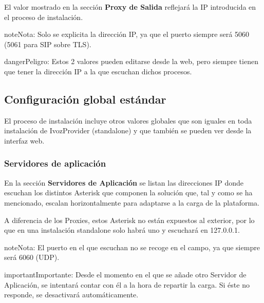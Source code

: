 \documentclass[letterpaper,10pt,spanish]{sphinxmanual}
\begin{document}
El valor mostrado en la sección \textbf{Proxy de Salida} reflejará la IP introducida en el proceso de instalación.

\noindent{}

\begin{notice}{note}{Nota:}
Solo se explicita la dirección IP, ya que el puerto siempre será 5060 (5061 para SIP sobre TLS).
\end{notice}

\begin{notice}{danger}{Peligro:}
Estos 2 valores pueden editarse desde la web, pero siempre tienen que tener la dirección IP a la que escuchan dichos procesos.
\end{notice}


\subsection{Configuración global estándar}
\label{internal_calls/god_portal:configuracion-global-estandar}
El proceso de instalación incluye otros valores globales que son iguales en toda instalación de IvozProvider (standalone) y que también se pueden ver desde la interfaz web.


\subsubsection{Servidores de aplicación}
\label{internal_calls/god_portal:servidores-de-aplicacion}
En la sección \textbf{Servidores de Aplicación} se listan las direcciones IP donde escuchan los distintos Asterisk que componen la solución que, tal y como se ha mencionado, escalan horizontalmente para adaptarse a la carga de la plataforma.

A diferencia de los Proxies, estos Asterisk no están expuestos al exterior, por lo que en una instalación standalone solo habrá uno y escuchará en 127.0.0.1.

\noindent{}

\begin{notice}{note}{Nota:}
El puerto en el que escuchan no se recoge en el campo, ya que siempre será 6060 (UDP).
\end{notice}

\begin{notice}{important}{Importante:}
Desde el momento en el que se añade otro Servidor de Aplicación, se intentará contar con él a la hora de repartir la carga. Si éste no responde, se desactivará automáticamente.
\end{notice}
\end{document}
